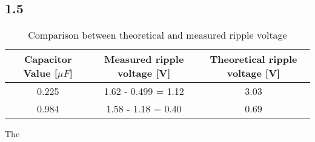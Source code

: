    

\subsection*{1.5}
    
   \begin{table}[htbp]
     \centering
     \caption{Comparison between theoretical and measured ripple voltage}
       \begin{tabular}{c|c|c}
       Capacitor Value [$\mu F$] & Measured ripple voltage [V] & Theoretical ripple voltage [V] \\
       \hline
       0.225         &     1.62 - 0.499 = 1.12        & 3.03 \\
       0.984         &     1.58 - 1.18 = 0.40         & 0.69 \\       
       \end{tabular}%
     \label{tab:addlabel}%
   \end{table}%

The 

    



